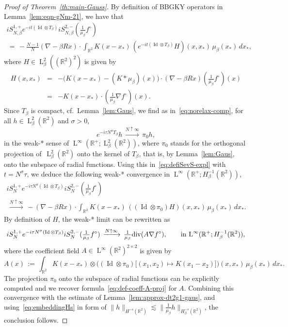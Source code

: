 \documentclass[a4paper,11pt,reqno,noindent]{amsart}
\theoremstyle{plain}
\numberwithin{equation}{section}
\newcommand{\R}{\mathbb R}
\newcommand{\Id}{\operatorname{Id}}
\newcommand{\Div}{{\operatorname{div}}}
\newcommand{\3}{|\!|\!|}
\newcommand{\Ld}{\operatorname{L}}
\begin{document}
\begin{proof}[Proof of Theorem~\ref{th:main-Gauss}]
By definition of BBGKY operators in Lemma~\ref{lem:eqn-gNm-21}, we have that
\begin{multline}\label{eq:defiSevS-expl}
iS_{N,\beta}^{1,+}e^{-it(\Id\otimes T_\beta)}iS_{N,\beta}^{2,-}(\tfrac{1}{\mu_\beta}f^{\circ})\\
\,=\,-\tfrac{N-1}N(\nabla-\beta Rx)\cdot\int_{\R^2}K(x-x_*)\,(e^{-it(\Id\otimes T_\beta)}H)(x,x_*)\,\mu_\beta(x_*)\,dx_*,
\end{multline}
where $H\in \Ld^2_\beta((\R^2)^2)$ is given by
\begin{eqnarray*}
H(x,x_*)&=&-\Big(K(x-x_*)-(K\ast\mu_\beta)(x)\Big)\cdot(\nabla-\beta Rx)(\tfrac{1}{\mu_\beta}f^{\circ})(x)\\
&=&-K(x-x_*)\cdot(\tfrac{1}{\mu_\beta}\nabla f^{\circ})(x).
\end{eqnarray*}
Since $T_\beta$ is compact, cf.~Lemma~\ref{lem:Gaus}, we find as in~\eqref{eq:norelax-comp}, for all $h\in\Ld^2_\beta(\R^2)$ and $\sigma>0$,
\begin{equation*}
e^{-i\tau N^\sigma T_\beta}h\,\xrightarrow{N\uparrow\infty}\,\pi_0h,
\end{equation*}
in the weak-* sense of $\Ld^\infty(\R^+;\Ld^2_\beta(\R^2))$, where $\pi_0$ stands for the orthogonal projection of~$\Ld^2_\beta(\R^2)$ onto the kernel of $T_\beta$, that is, by Lemma~\ref{lem:Gaus}, onto the subspace of radial functions.
Using this in~\eqref{eq:defiSevS-expl} with $t=N^\sigma\tau$, we deduce the following weak-* convergence in $\Ld^\infty(\R^+;H^{-1}_\beta(\R^2))$,
\begin{multline*}
iS_N^{1,+}e^{-i\tau N^\sigma(\Id\otimes T_\beta)}iS_N^{2,-}(\tfrac{1}{\mu_\beta}f^{\circ})\\
\,\xrightarrow{N\uparrow\infty}\,-(\nabla-\beta Rx)\cdot\int_{\R^2}K(x-x_*)\,((\Id\otimes\pi_0)H)(x,x_*)\,\mu_\beta(x_*)\,dx_*.
\end{multline*}
By definition of $H$, the weak-* limit can be rewritten as
\begin{equation*}
iS_N^{1,+}e^{-i\tau N^\sigma(\Id\otimes T_\beta)}iS_N^{2,-}(\tfrac{1}{\mu_\beta}f^{\circ})\\
\,\xrightarrow{N\uparrow\infty}\,\tfrac1{\mu_\beta}\Div( A\nabla f^\circ),\qquad\text{in $\Ld^\infty(\R^+;H^{-1}_\beta(\R^2))$},
\end{equation*}
where the coefficient field $A\in\Ld^\infty(\R^2)^{2\times 2}$ is given by
\begin{equation*}
A(x)\,:=\,\int_{\R^2}K(x-x_*)\otimes\Big((\Id\otimes\pi_0)\big[(x_1,x_2)\mapsto K(x_1-x_2)\big]\Big)(x,x_*)\,\mu_\beta(x_*)\,dx_*.
\end{equation*}
The projection $\pi_0$ onto the subspace of radial functions can be explicitly computed and we recover formula~\eqref{eq:def-coeff-A-proj} for $A$.
Combining this convergence with the estimate of Lemma~\ref{lem:approx-dt2g1-gaus}, and using~\eqref{eq:embeddingHs} in form of $\|h\|_{H^{-s}(\R^2)}\lesssim\|\frac1{\mu_\beta} h\|_{H^{-s}_\beta(\R^2)}$,
the conclusion follows.
\end{proof}
\end{document}
